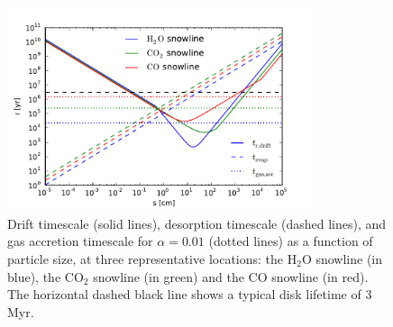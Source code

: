 \documentclass[12pt, preprint]{aastex}
\begin{document}
\begin{figure}[htb]
\centering
\includegraphics[width=0.8\textwidth]{../figs/drift_timescales_betaS1_gas_acc.pdf}
\caption{Drift timescale (solid lines), desorption timescale (dashed lines), and gas accretion timescale for $\alpha=0.01$ (dotted lines) as a function of particle size, at three representative locations: the H$_2$O snowline (in blue), the CO$_2$ snowline (in green) and the CO snowline (in red). The horizontal dashed black line shows a typical disk lifetime of 3 Myr.} %
\label{fig:drift_times}
\end{figure}
\end{document}
